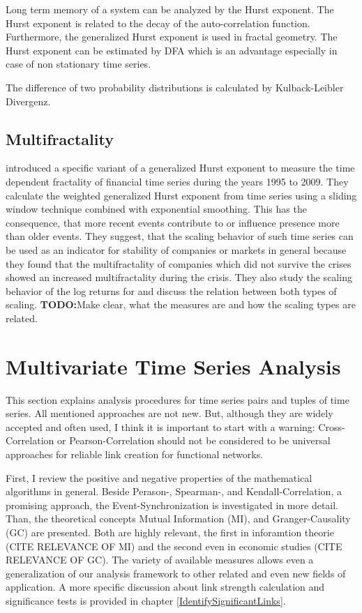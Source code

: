 \documentclass[a4paper,10pt]{scrbook}
\begin{document}
Long term memory of a system can be analyzed by the Hurst exponent. The Hurst exponent is related to the decay of the auto-correlation function. Furthermore, the generalized Hurst exponent is used in fractal geometry. The Hurst exponent can be estimated by DFA which is an advantage especially in case of non stationary time series. 

The difference of two probability distributions is calculated by Kulback-Leibler Divergenz.

\subsection{Multifractality}

\cite{Morales2012a} introduced a specific variant of a generalized Hurst exponent to measure the time dependent fractality of financial time series during the years 1995 to 2009. They calculate the weighted generalized Hurst exponent from time series using a sliding window technique combined with exponential smoothing. This has the consequence, that more recent events contribute to or influence presence more than older events. They suggest, that the scaling behavior of such time series can be used as an indicator for stability of companies or markets in general because they found that the multifractality of companies which did not survive the crises showed an increased multifractality during the crisis. They also study the scaling behavior of the log returns for and discuss the relation between both types of scaling.
\textbf{TODO:}Make clear, what the measures are and how the scaling types are related.


\section{Multivariate Time Series Analysis}

This section explains analysis procedures for time series pairs and tuples of time series. All mentioned approaches are not new. But, although they are widely accepted and often used, I think it is important to start with a warning: Cross-Correlation or Pearson-Correlation should not be considered to be universal approaches for reliable link creation for functional networks. 



First, I review the positive and negative properties of the mathematical algorithms in general. Beside Perason-, Spearman-, and Kendall-Correlation, a promising approach, the Event-Synchronization is investigated in more detail. Than, the theoretical concepts Mutual Information (MI), and Granger-Causality (GC) are presented. Both are highly relevant, the first in inforamtion theorie (CITE RELEVANCE OF MI) and the second even in economic studies (CITE RELEVANCE OF GC). The variety of available measures allows even a generalization of our analysis framework to other related and even new fields of application. A more specific discussion about link strength calculation and significance tests is provided in chapter \ref{IdentifySignificantLinks}.
\end{document}
